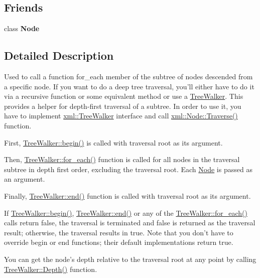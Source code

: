\subsection*{Friends}
\begin{DoxyCompactItemize}
\item 
\hypertarget{classphys_1_1xml_1_1TreeWalker_a6db9d28bd448a131448276ee03de1e6d}{
class {\bfseries Node}}
\label{d5/d8d/classphys_1_1xml_1_1TreeWalker_a6db9d28bd448a131448276ee03de1e6d}

\end{DoxyCompactItemize}


\subsection{Detailed Description}
Used to call a function for\_\-each member of the subtree of nodes descended from a specific node. If you want to do a deep tree traversal, you'll either have to do it via a recursive function or some equivalent method or use a \hyperlink{classphys_1_1xml_1_1TreeWalker}{TreeWalker}. This provides a helper for depth-\/first traversal of a subtree. In order to use it, you have to implement \hyperlink{classphys_1_1xml_1_1TreeWalker}{xml::TreeWalker} interface and call \hyperlink{classphys_1_1xml_1_1Node_a0029d08d3689c36d882ada0c0c9cf6e9}{xml::Node::Traverse()} function. \par
\par
 First, \hyperlink{classphys_1_1xml_1_1TreeWalker_a649d9e5a06542be0282d3d20994a62fc}{TreeWalker::begin()} is called with traversal root as its argument.\par
 Then, \hyperlink{classphys_1_1xml_1_1TreeWalker_a03267e73acac44809f16739fd00a536d}{TreeWalker::for\_\-each()} function is called for all nodes in the traversal subtree in depth first order, excluding the traversal root. Each \hyperlink{classphys_1_1xml_1_1Node}{Node} is passed as an argument.\par
 Finally, \hyperlink{classphys_1_1xml_1_1TreeWalker_a210f6d60579a152f89e651be797885b9}{TreeWalker::end()} function is called with traversal root as its argument.\par
\par
 If \hyperlink{classphys_1_1xml_1_1TreeWalker_a649d9e5a06542be0282d3d20994a62fc}{TreeWalker::begin()}, \hyperlink{classphys_1_1xml_1_1TreeWalker_a210f6d60579a152f89e651be797885b9}{TreeWalker::end()} or any of the \hyperlink{classphys_1_1xml_1_1TreeWalker_a03267e73acac44809f16739fd00a536d}{TreeWalker::for\_\-each()} calls return false, the traversal is terminated and false is returned as the traversal result; otherwise, the traversal results in true. Note that you don't have to override begin or end functions; their default implementations return true.\par
\par
 You can get the node's depth relative to the traversal root at any point by calling \hyperlink{classphys_1_1xml_1_1TreeWalker_a90fdd705ae4d5e8e3b931bb8896e4397}{TreeWalker::Depth()} function. 

